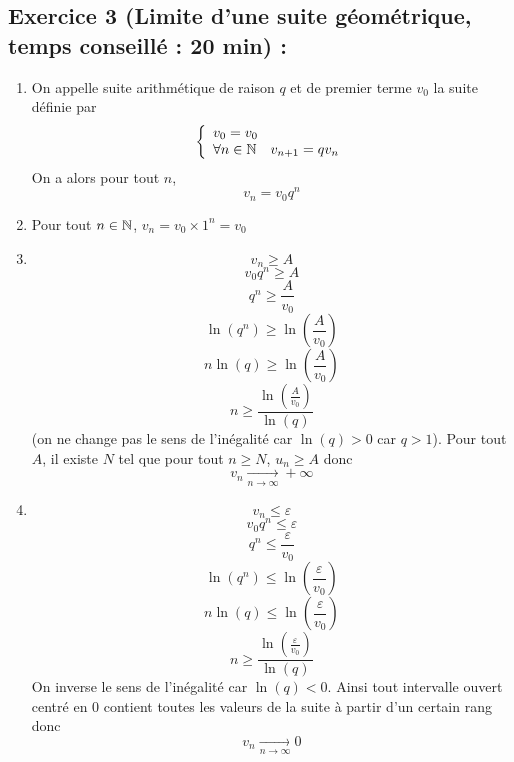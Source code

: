 \subsection*{Exercice 3 (Limite d'une suite géométrique, temps conseillé : 20 min) : }
\begin{enumerate}
\item On appelle suite arithmétique de raison $q$ et de premier terme $v_0$ la suite définie par $$\left\{\begin{array}{l} v_0 = v_0 \\ \forall n \in \mathbb{N} \quad v_{n+1} = qv_n\end{array}\right.$$
On a alors pour tout $n$, $$\boxed{v_n = v_0 q^n}$$
\item Pour tout $n\in \mathbb{N}$, $v_n = v_0\times1^n = v_0$
\item 
$$v_n \geq A$$
$$v_0 q^n \geq A$$
$$q^n \geq \frac{A}{v_0}$$
$$\ln(q^n) \geq \ln\left(\frac{A}{v_0}\right)$$
$$n\ln(q) \geq \ln\left(\frac{A}{v_0}\right)$$
$$\boxed{n\geq \frac{\ln(\frac{A}{v_0})}{\ln(q)}}$$
(on ne change pas le sens de l'inégalité car $\ln(q) > 0$ car $q>1$). Pour tout $A$, il existe $N$ tel que pour tout $n \geq N$, $u_n \geq A$ donc $$\boxed{v_n \underset{n\rightarrow \infty}{\longrightarrow} +\infty}$$
\item
$$v_n \leq \varepsilon$$
$$v_0 q^n \leq \varepsilon$$
$$q^n \leq \frac{\varepsilon}{v_0}$$
$$\ln(q^n) \leq \ln\left(\frac{\varepsilon}{v_0}\right)$$
$$n\ln(q) \leq \ln\left(\frac{\varepsilon}{v_0}\right)$$
$$\boxed{n \geq \frac{\ln\left(\frac{\varepsilon}{v_0}\right)}{\ln(q)}}$$
On inverse le sens de l'inégalité car $\ln(q) < 0$. Ainsi tout intervalle ouvert centré en 0 contient toutes les valeurs de la suite à partir d'un certain rang donc 
$$\boxed{v_n \underset{n\rightarrow \infty}{\longrightarrow} 0}$$
\end{enumerate}
